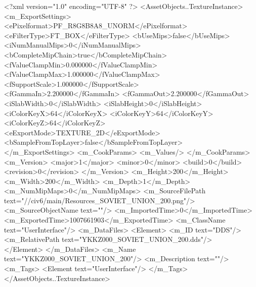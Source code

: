 <?xml version="1.0" encoding="UTF-8" ?>
<AssetObjects..TextureInstance>
	<m_ExportSettings>
		<ePixelformat>PF_R8G8B8A8_UNORM</ePixelformat>
		<eFilterType>FT_BOX</eFilterType>
		<bUseMips>false</bUseMips>
		<iNumManualMips>0</iNumManualMips>
		<bCompleteMipChain>true</bCompleteMipChain>
		<fValueClampMin>0.000000</fValueClampMin>
		<fValueClampMax>1.000000</fValueClampMax>
		<fSupportScale>1.000000</fSupportScale>
		<fGammaIn>2.200000</fGammaIn>
		<fGammaOut>2.200000</fGammaOut>
		<iSlabWidth>0</iSlabWidth>
		<iSlabHeight>0</iSlabHeight>
		<iColorKeyX>64</iColorKeyX>
		<iColorKeyY>64</iColorKeyY>
		<iColorKeyZ>64</iColorKeyZ>
		<eExportMode>TEXTURE_2D</eExportMode>
		<bSampleFromTopLayer>false</bSampleFromTopLayer>
	</m_ExportSettings>
	<m_CookParams>
		<m_Values/>
	</m_CookParams>
	<m_Version>
		<major>1</major>
		<minor>0</minor>
		<build>0</build>
		<revision>0</revision>
	</m_Version>
	<m_Height>200</m_Height>
	<m_Width>200</m_Width>
	<m_Depth>1</m_Depth>
	<m_NumMipMaps>0</m_NumMipMaps>
	<m_SourceFilePath text="//civ6/main/Resources_SOVIET_UNION_200.png"/>
	<m_SourceObjectName text=""/>
	<m_ImportedTime>0</m_ImportedTime>
	<m_ExportedTime>1007661903</m_ExportedTime>
	<m_ClassName text="UserInterface"/>
	<m_DataFiles>
		<Element>
			<m_ID text="DDS"/>
			<m_RelativePath text="YKKZ000_SOVIET_UNION_200.dds"/>
		</Element>
	</m_DataFiles>
	<m_Name text="YKKZ000_SOVIET_UNION_200"/>
	<m_Description text=""/>
	<m_Tags>
		<Element text="UserInterface"/>
	</m_Tags>
</AssetObjects..TextureInstance>

